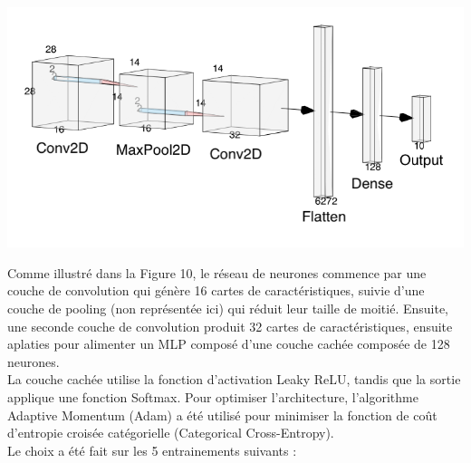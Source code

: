 \begin{multicols}{2}
\includegraphics[width=\columnwidth]{images/mnist_nn.png}
\hfill\break

Comme illustré dans la Figure 10, le réseau de neurones commence par une couche de convolution qui 
génère 16 cartes de caractéristiques, suivie d’une couche de pooling (non représentée ici) qui réduit leur taille de moitié.
Ensuite, une seconde couche de convolution produit 32 cartes de caractéristiques, ensuite aplaties pour alimenter 
un MLP composé d'une couche cachée composée de 128 neurones. \\

La couche cachée utilise la fonction d’activation Leaky ReLU, tandis que la sortie 
applique une fonction Softmax. Pour optimiser l'architecture, l’algorithme Adaptive Momentum (Adam) a été utilisé pour minimiser 
la fonction de coût d’entropie croisée catégorielle (Categorical Cross-Entropy). \\

Le choix a été fait sur les 5 entrainements suivants : \\


\end{multicols}
